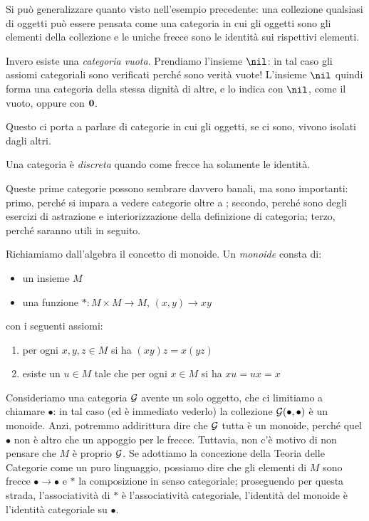 \begin{esempio}
Si può generalizzare quanto visto nell'esempio precedente: una collezione qualsiasi di oggetti può essere pensata come una categoria in cui gli oggetti sono gli elementi della collezione e le uniche frecce sono le identità sui rispettivi elementi.
\end{esempio}

\begin{esempio}
Invero esiste una {\em categoria vuota}. Prendiamo l'insieme \(\nil\): in tal caso gli assiomi categoriali sono verificati perché sono verità vuote! L'insieme \(\nil\) quindi forma una categoria della stessa dignità di altre, e lo indica con \(\nil\), come il vuoto, oppure con \(\mathbf{0}\).
\end{esempio}

Questo ci porta a parlare di categorie in cui gli oggetti, se ci sono, vivono isolati dagli altri.

\begin{definizione}
Una categoria è {\em discreta} quando come frecce ha solamente le identità.
\end{definizione}

\begin{nota}
Queste prime categorie possono sembrare davvero banali, ma sono importanti: primo, perché si impara a vedere categorie oltre a ; secondo, perché sono degli esercizi di astrazione e interiorizzazione della definizione di categoria; terzo, perché saranno utili in seguito. 
\end{nota}

\begin{esempio}\label{esempio:MonoidsAreCats}
Richiamiamo dall'algebra il concetto di monoide. Un {\em monoide} consta di:
\begin{itemize}
\item un insieme \(M\)
\item una funzione \(\ast : M \times M \to M\), \((x,y) \to xy\)
\end{itemize}
con i seguenti assiomi:
\begin{enumerate}
\item per ogni \(x,y,z \in M\) si ha \((xy)z = x(yz)\)
\item esiste un \(u \in M\) tale che per ogni \(x \in M\) si ha \(xu = ux = x\)
\end{enumerate}
Consideriamo una categoria \(\mathcal G\) avente un solo oggetto, che ci limitiamo a chiamare \(\bullet\): in tal caso (ed è immediato vederlo) la collezione \(\mathcal G(\bullet,\bullet)\) è un monoide. Anzi, potremmo addirittura dire che \(\mathcal G\) tutta è un monoide, perché quel \(\bullet\) non è altro che un appoggio per le frecce. Tuttavia, non c'è motivo di non pensare che \(M\) è proprio \(\mathcal G\). Se adottiamo la concezione della Teoria delle Categorie come un puro linguaggio, possiamo dire che gli elementi di \(M\) sono frecce \(\bullet \to \bullet\) e \(\ast\) la composizione in senso categoriale; proseguendo per questa strada, l'associatività di \(\ast\) è l'associatività categoriale, l'identità del monoide è l'identità categoriale su \(\bullet\).
\end{esempio}

